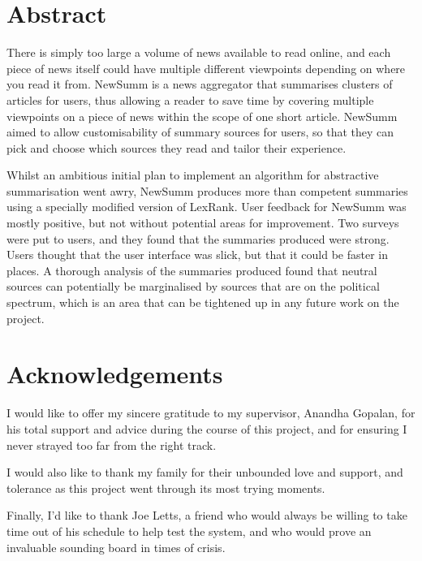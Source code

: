 \documentclass[12pt]{article}
\begin{document}

\section*{Abstract}

There is simply too large a volume of news available to read online, and each piece of news itself could have multiple different viewpoints depending on where you read it from. NewSumm is a news aggregator that summarises clusters of articles for users, thus allowing a reader to save time by covering multiple viewpoints on a piece of news within the scope of one short article. NewSumm aimed to allow customisability of summary sources for users, so that they can pick and choose which sources they read and tailor their experience.

Whilst an ambitious initial plan to implement an algorithm for abstractive summarisation went awry, NewSumm produces more than competent summaries using a specially modified version of LexRank. User feedback for NewSumm was mostly positive, but not without potential areas for improvement. Two surveys were put to users, and they found that the summaries produced were strong. Users thought that the user interface was slick, but that it could be faster in places. A thorough analysis of the summaries produced found that neutral sources can potentially be marginalised by sources that are on the political spectrum, which is an area that can be tightened up in any future work on the project. 

\pagebreak

\section*{Acknowledgements}

I would like to offer my sincere gratitude to my supervisor, Anandha Gopalan, for his total support and advice during the course of this project, and for ensuring I never strayed too far from the right track.

I would also like to thank my family for their unbounded love and support, and tolerance as this project went through its most trying moments.

Finally, I'd like to thank Joe Letts, a friend who would always be willing to take time out of his schedule to help test the system, and who would prove an invaluable sounding board in times of crisis.
\end{document}
